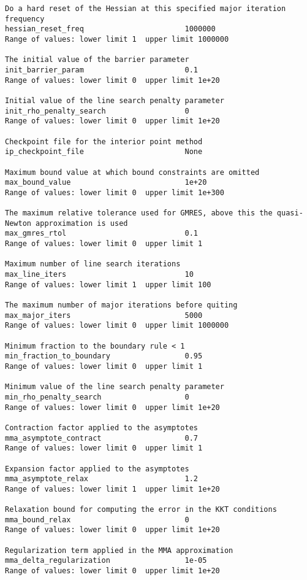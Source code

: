 \documentclass[12pt]{article}
\begin{document}
{\begin{verbatim}
Do a hard reset of the Hessian at this specified major iteration frequency
hessian_reset_freq                       1000000
Range of values: lower limit 1  upper limit 1000000

The initial value of the barrier parameter
init_barrier_param                       0.1
Range of values: lower limit 0  upper limit 1e+20

Initial value of the line search penalty parameter
init_rho_penalty_search                  0
Range of values: lower limit 0  upper limit 1e+20

Checkpoint file for the interior point method
ip_checkpoint_file                       None

Maximum bound value at which bound constraints are omitted
max_bound_value                          1e+20
Range of values: lower limit 0  upper limit 1e+300

The maximum relative tolerance used for GMRES, above this the quasi-Newton approximation is used
max_gmres_rtol                           0.1
Range of values: lower limit 0  upper limit 1

Maximum number of line search iterations
max_line_iters                           10
Range of values: lower limit 1  upper limit 100

The maximum number of major iterations before quiting
max_major_iters                          5000
Range of values: lower limit 0  upper limit 1000000

Minimum fraction to the boundary rule < 1
min_fraction_to_boundary                 0.95
Range of values: lower limit 0  upper limit 1

Minimum value of the line search penalty parameter
min_rho_penalty_search                   0
Range of values: lower limit 0  upper limit 1e+20

Contraction factor applied to the asymptotes
mma_asymptote_contract                   0.7
Range of values: lower limit 0  upper limit 1

Expansion factor applied to the asymptotes
mma_asymptote_relax                      1.2
Range of values: lower limit 1  upper limit 1e+20

Relaxation bound for computing the error in the KKT conditions
mma_bound_relax                          0
Range of values: lower limit 0  upper limit 1e+20

Regularization term applied in the MMA approximation
mma_delta_regularization                 1e-05
Range of values: lower limit 0  upper limit 1e+20


\end{verbatim}}
\end{document}
